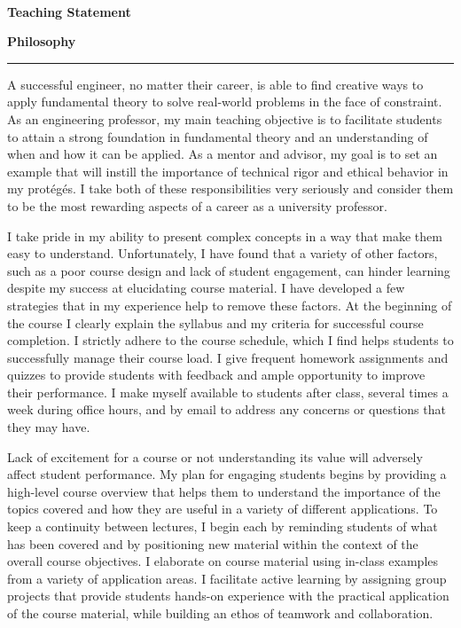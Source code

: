 \documentclass[letterpaper,11pt]{article}
\begin{document}
\thispagestyle{plain}

\raggedright

\begin{center}
{}\\
\bigskip{}
\textbf{\Large Teaching Statement}\\
\end{center}

\bigskip{}
\textbf{\Large{Philosophy}} \smallskip \hrule \medskip
A successful engineer, no matter their career, is able to find creative ways to apply fundamental theory to solve real-world problems in the face of constraint. As an engineering professor, my main teaching objective is to facilitate students to attain a strong foundation in fundamental theory and an understanding of when and how it can be applied. As a mentor and advisor, my goal is to set an example that will instill the importance of technical rigor and ethical behavior in my protégés. I take both of these responsibilities very seriously and consider them to be the most rewarding aspects of a career as a university professor.

I take pride in my ability to present complex concepts in a way that make them easy to understand. Unfortunately, I have found that a variety of other factors, such as a poor course design and lack of student engagement, can hinder learning despite my success at elucidating course material. I have developed a few strategies that in my experience help to remove these factors. At the beginning of the course I clearly explain the syllabus and my criteria for successful course completion. I strictly adhere to the course schedule, which I find helps students to successfully manage their course load. I give frequent homework assignments and quizzes to provide students with feedback and ample opportunity to improve their performance. I make myself available to students after class, several times a week during office hours, and by email to address any concerns or questions that they may have.

Lack of excitement for a course or not understanding its value will adversely affect student performance. My plan for engaging students begins by providing a high-level course overview that helps them to understand the importance of the topics covered and how they are useful in a variety of different applications. To keep a continuity between lectures, I begin each by reminding students of what has been covered and by positioning new material within the context of the overall course objectives. I elaborate on course material using in-class examples from a variety of application areas. I facilitate active learning by assigning group projects that provide students hands-on experience with the practical application of the course material, while building an ethos of teamwork and collaboration.
\end{document}
